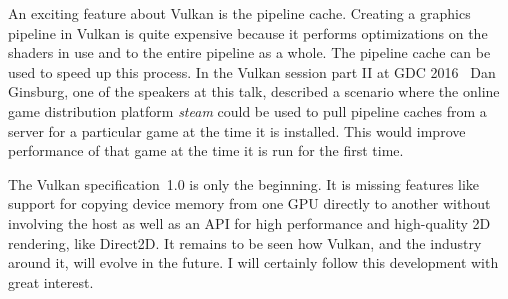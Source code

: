   An exciting feature about Vulkan is the pipeline cache.
  Creating a graphics pipeline in Vulkan is quite expensive because it performs optimizations on the shaders in use and to the entire pipeline as a whole.
  The pipeline cache can be used to speed up this process.
  In the Vulkan session part II at GDC 2016~\cite{vksessiongdc16} Dan Ginsburg, one of the speakers at this talk, described a scenario where the online game distribution platform \textit{steam} could be used to pull pipeline caches from a server for a particular game at the time it is installed.
  This would improve performance of that game at the time it is run for the first time.

  The Vulkan specification~1.0 is only the beginning.
  It is missing features like support for copying device memory from one GPU directly to another without involving the host as well as an API for high performance and high-quality 2D rendering, like Direct2D.
  It remains to be seen how Vulkan, and the industry around it, will evolve in the future.
  I will certainly follow this development with great interest.

